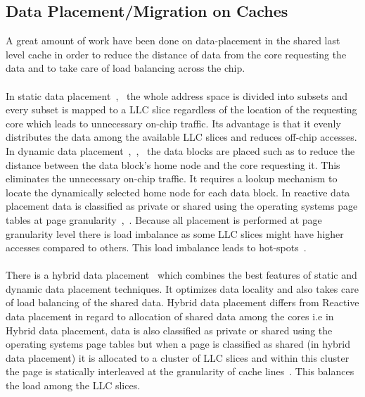 \documentclass{listhesis}
\begin{document}
\subsection{Data Placement/Migration on Caches}
A great amount of work have been done on data-placement in the shared last level cache in order to reduce the distance of data from the core requesting the data and to take care of load balancing across the chip.\\
\\
In static data placement~\cite{cacheDataPlacement1},~\cite{cacheDataPlacement2} the whole address space is divided into subsets and every subset is mapped to a LLC slice regardless of the location of the requesting core which leads to unnecessary on-chip traffic. Its advantage is that it evenly distributes the data among the available LLC slices and reduces off-chip accesses. In dynamic data placement~\cite{cacheDataPlacement1},~\cite{cacheDataPlacement3},~\cite{cacheDataPlacement4} the data blocks are placed such as to reduce the distance between the data block's home node and the core requesting it. This eliminates the unnecessary on-chip traffic. It requires a lookup mechanism to locate the dynamically selected home node for each data block. In reactive data placement data is classified as private or shared using the operating systems page tables at page granularity~\cite{cacheDataPlacement4},~\cite{cacheDataPlacement6}. Because all placement is performed at page granularity level there is load imbalance as some LLC slices might have higher accesses compared to others. This load imbalance leads to hot-spots~\cite{cacheDataPlacement6}.\\
\\
There is a hybrid data placement~\cite{cacheDataPlacement6} which combines the best features of static and dynamic data placement techniques. It optimizes data locality and also takes care of load balancing of the shared data. Hybrid data placement differs from Reactive data placement in regard to allocation of shared data among the cores i.e in Hybrid data placement, data is also classified as private or shared using the operating systems page tables but when a page is classified as shared (in hybrid data placement) it is allocated to a cluster of LLC slices and within this cluster the page is statically interleaved at the granularity of cache lines~\cite{cacheDataPlacement6}. This balances the load among the LLC slices.\\
\end{document}
